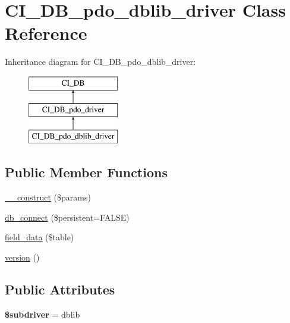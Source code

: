 \hypertarget{class_c_i___d_b__pdo__dblib__driver}{}\section{C\+I\+\_\+\+D\+B\+\_\+pdo\+\_\+dblib\+\_\+driver Class Reference}
\label{class_c_i___d_b__pdo__dblib__driver}
Inheritance diagram for C\+I\+\_\+\+D\+B\+\_\+pdo\+\_\+dblib\+\_\+driver\+:\begin{figure}[H]
\begin{center}
\leavevmode
\includegraphics[height=3.000000cm]{class_c_i___d_b__pdo__dblib__driver}
\end{center}
\end{figure}
\subsection*{Public Member Functions}
\begin{DoxyCompactItemize}
\item 
\mbox{\hyperlink{class_c_i___d_b__pdo__dblib__driver_a76a5061755752b903b745fac17b8eb56}{\+\_\+\+\_\+construct}} (\$params)
\item 
\mbox{\hyperlink{class_c_i___d_b__pdo__dblib__driver_ac99c9971036cdece3f6511039e5bbb26}{db\+\_\+connect}} (\$persistent=F\+A\+L\+SE)
\item 
\mbox{\hyperlink{class_c_i___d_b__pdo__dblib__driver_af463cbc58a25b8f2624fdb36d95b7f06}{field\+\_\+data}} (\$table)
\item 
\mbox{\hyperlink{class_c_i___d_b__pdo__dblib__driver_ab79e90d8a40dca7daf10bdd726bd1ed7}{version}} ()
\end{DoxyCompactItemize}
\subsection*{Public Attributes}
\begin{DoxyCompactItemize}
\item 
\mbox{\label{class_c_i___d_b__pdo__dblib__driver_a58ef9c97257f692be74dcb9ce34dc6bd}} 
{\bfseries \$subdriver} = \textquotesingle{}dblib\textquotesingle{}
\end{DoxyCompactItemize}
